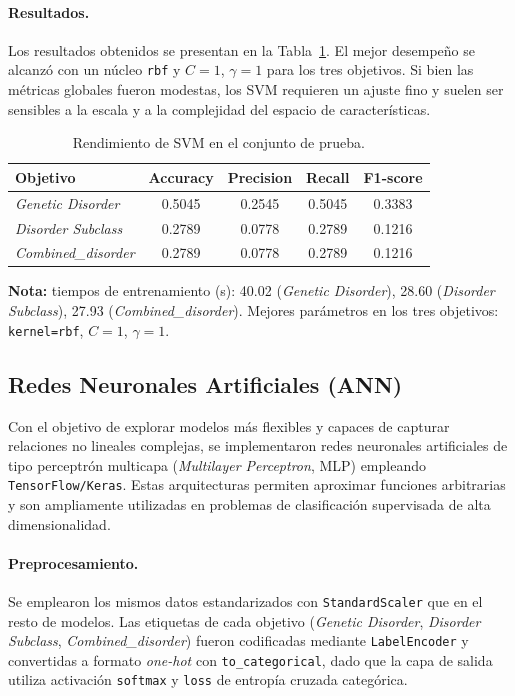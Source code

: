 \documentclass[11pt,a4paper,spanish]{book}
\numberwithin{equation}{chapter}
\numberwithin{figure}{chapter}
\begin{document}
\paragraph{Resultados.}
Los resultados obtenidos se presentan en la Tabla~\ref{tab:svm-resultados}. El mejor desempeño
se alcanzó con un núcleo \texttt{rbf} y $C=1$, $\gamma=1$ para los tres objetivos.
Si bien las métricas globales fueron modestas, los SVM requieren un ajuste fino y suelen ser sensibles
a la escala y a la complejidad del espacio de características.

\begin{table}[H]
\centering
\caption{Rendimiento de SVM en el conjunto de prueba.}
\label{tab:svm-resultados}
\begin{tabular}{lcccc}
\toprule
\textbf{Objetivo} & \textbf{Accuracy} & \textbf{Precision} & \textbf{Recall} & \textbf{F1-score} \\
\midrule
\textit{Genetic Disorder}   & 0.5045 & 0.2545 & 0.5045 & 0.3383 \\
\textit{Disorder Subclass}  & 0.2789 & 0.0778 & 0.2789 & 0.1216 \\
\textit{Combined\_disorder} & 0.2789 & 0.0778 & 0.2789 & 0.1216 \\
\bottomrule
\end{tabular}

\vspace{0.5em}
\footnotesize
\textbf{Nota:} tiempos de entrenamiento (s): 40.02 (\textit{Genetic Disorder}),
28.60 (\textit{Disorder Subclass}), 27.93 (\textit{Combined\_disorder}).
Mejores parámetros en los tres objetivos: \texttt{kernel=rbf}, $C=1$, $\gamma=1$.
\end{table}


\subsection{Redes Neuronales Artificiales (ANN)}
\label{subsec:ann}

Con el objetivo de explorar modelos más flexibles y capaces de capturar relaciones no lineales complejas,
se implementaron redes neuronales artificiales de tipo perceptrón multicapa (\textit{Multilayer Perceptron}, MLP)
empleando \texttt{TensorFlow/Keras}. Estas arquitecturas permiten aproximar funciones arbitrarias
y son ampliamente utilizadas en problemas de clasificación supervisada de alta dimensionalidad.

\paragraph{Preprocesamiento.}
Se emplearon los mismos datos estandarizados con \texttt{StandardScaler} que en el resto de modelos.
Las etiquetas de cada objetivo (\textit{Genetic Disorder}, \textit{Disorder Subclass},
\textit{Combined\_disorder}) fueron codificadas mediante \texttt{LabelEncoder} y convertidas a
formato \textit{one-hot} con \texttt{to\_categorical}, dado que la capa de salida utiliza
activación \texttt{softmax} y \texttt{loss} de entropía cruzada categórica.
\end{document}
